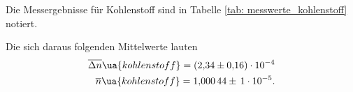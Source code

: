 Die Messergebnisse für Kohlenstoff sind in Tabelle \ref{tab: messwerte_kohlenstoff} notiert.



Die sich daraus folgenden Mittelwerte lauten %
\begin{align}
  \label{eq:mittelwerte_kohlenstoff}
  \begin{aligned}
    \overline{\Delta n}\ua{kohlenstoff}=\num{2.34\pm 0.16 e-4}\\
    \overline{n}\ua{kohlenstoff}=\num{1.00044} \pm\,\num{1e-5}.
  \end{aligned}
\end{align}
